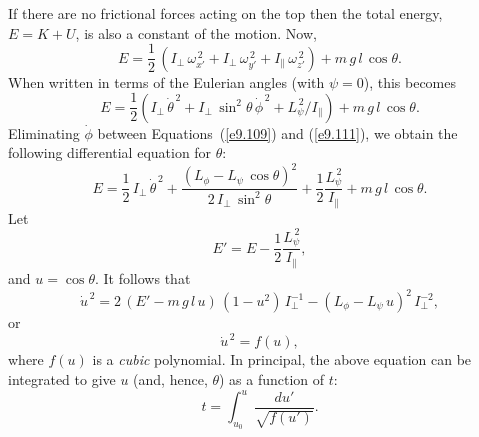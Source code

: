 If there are no frictional forces acting on the top then the total
energy, $E=K+U$, is also a constant of the motion. Now,
\begin{equation}
E = \frac{1}{2}\,\left(I_\perp\,\omega_{x'}^{\,2} + I_\perp\,\omega_{y'}^{\,2}+
I_\parallel\,\omega_{z'}^{\,2}\right) + m\,g\,l\,\cos\theta.
\end{equation}
When written in terms of the Eulerian angles (with $\psi=0$), this
becomes
\begin{equation}\label{e9.111}
E=\frac{1}{2}\left(I_\perp\,\dot{\theta}^{\,2} + I_\perp\,\sin^2\theta\,\dot{\phi}^{\,2} + L_\psi^{\,2}/I_\parallel\right) + m\,g\,l\,\cos\theta.
\end{equation}
Eliminating $\dot{\phi}$ between Equations~(\ref{e9.109}) and (\ref{e9.111}),
we obtain the following differential equation for $\theta$:
\begin{equation}
E = \frac{1}{2}\,I_\perp\,\dot{\theta}^{\,2} + \frac{(L_\phi-L_\psi\,\cos\theta)^2}{2\,I_\perp\,\sin^2\theta} + \frac{1}{2}\frac{L_\psi^{\,2}}{I_\parallel} + m\,g\,l\,\cos\theta.
\end{equation}
Let
\begin{equation}
E' = E - \frac{1}{2}\frac{L_\psi^{\,2}}{I_\parallel},
\end{equation}
and $u=\cos\theta$. It follows that
\begin{equation}
\dot{u}^{\,2} = 2\,(E' -m\,g\,l\,u)\,(1-u^2)\,I_\perp^{-1} - (L_\phi-L_\psi\,u)^2\,I_\perp^{-2},
\end{equation}
or
\begin{equation}\label{e9.115}
\dot{u}^{\,2} = f(u),
\end{equation}
where $f(u)$ is a {\em cubic}\/ polynomial. In principal, the above equation
can be integrated to give $u$ (and, hence, $\theta$) as a function of $t$:
\begin{equation}\label{e9.116}
t = \int_{u_0}^u\frac{du'}{\sqrt{f(u')}}.
\end{equation}

